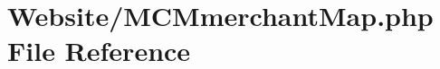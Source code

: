 \hypertarget{_m_c_mmerchant_map_8php}{\section{Website/\-M\-C\-Mmerchant\-Map.php File Reference}
\label{_m_c_mmerchant_map_8php}
}
